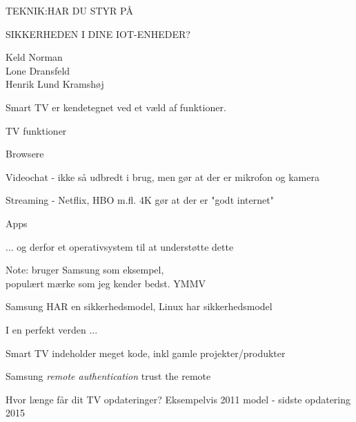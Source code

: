\documentclass[20pt,landscape,a4paper,footrule]{foils}
\begin{document}



{\LARGE TEKNIK:HAR DU STYR PÅ

SIKKERHEDEN I DINE IOT-ENHEDER?}

Keld Norman\\
Lone Dransfeld\\
Henrik Lund Kramshøj





Smart TV er kendetegnet ved et væld af funktioner.

\begin{list1}
\item TV funktioner
\item Browsere
\item Videochat - ikke så udbredt i brug, men gør at der er mikrofon og kamera
\item Streaming - Netflix, HBO m.fl. 4K gør at der er "godt internet"
\item Apps
\item ... og derfor et operativsystem til at understøtte dette
\end{list1}

Note: bruger Samsung som eksempel, \\
populært mærke som jeg kender bedst. YMMV



\begin{list1}
\item Samsung HAR en sikkerhedsmodel, Linux har sikkerhedsmodel
\item I en perfekt verden ...
\end{list1}




\begin{list1}
\item Smart TV indeholder meget kode, inkl gamle projekter/produkter
\item Samsung \emph{remote authentication} trust the remote  \smiley
\item Hvor længe får dit TV opdateringer? Eksempelvis 2011 model - sidste opdatering 2015
\end{list1}
\end{document}
